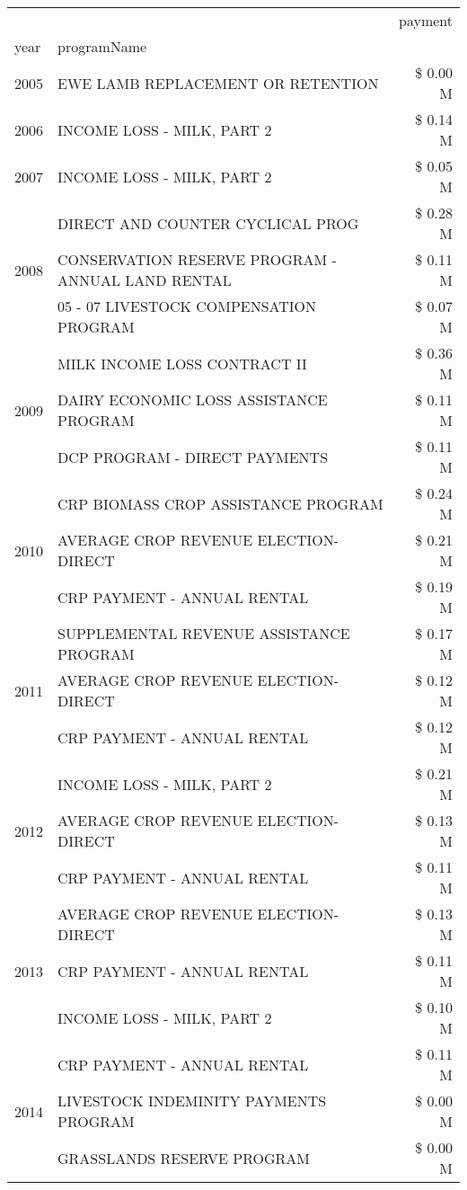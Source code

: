 \begin{tabular}{llr}
\toprule
 &  & payment \\
year & programName &  \\
\midrule
2005 & EWE LAMB REPLACEMENT OR RETENTION & \$ 0.00 M \\
\cline{1-3}
2006 & INCOME LOSS - MILK, PART 2 & \$ 0.14 M \\
\cline{1-3}
2007 & INCOME LOSS - MILK, PART 2 & \$ 0.05 M \\
\cline{1-3}
\multirow[t]{3}{*}{2008} & DIRECT AND COUNTER CYCLICAL PROG & \$ 0.28 M \\
 & CONSERVATION RESERVE PROGRAM - ANNUAL LAND RENTAL & \$ 0.11 M \\
 & 05 - 07 LIVESTOCK COMPENSATION PROGRAM & \$ 0.07 M \\
\cline{1-3}
\multirow[t]{3}{*}{2009} & MILK INCOME LOSS CONTRACT II & \$ 0.36 M \\
 & DAIRY ECONOMIC LOSS ASSISTANCE PROGRAM & \$ 0.11 M \\
 & DCP PROGRAM - DIRECT PAYMENTS & \$ 0.11 M \\
\cline{1-3}
\multirow[t]{3}{*}{2010} & CRP BIOMASS CROP ASSISTANCE PROGRAM & \$ 0.24 M \\
 & AVERAGE CROP REVENUE ELECTION-DIRECT & \$ 0.21 M \\
 & CRP PAYMENT - ANNUAL RENTAL & \$ 0.19 M \\
\cline{1-3}
\multirow[t]{3}{*}{2011} & SUPPLEMENTAL REVENUE ASSISTANCE PROGRAM & \$ 0.17 M \\
 & AVERAGE CROP REVENUE ELECTION-DIRECT & \$ 0.12 M \\
 & CRP PAYMENT - ANNUAL RENTAL & \$ 0.12 M \\
\cline{1-3}
\multirow[t]{3}{*}{2012} & INCOME LOSS - MILK, PART 2 & \$ 0.21 M \\
 & AVERAGE CROP REVENUE ELECTION-DIRECT & \$ 0.13 M \\
 & CRP PAYMENT - ANNUAL RENTAL & \$ 0.11 M \\
\cline{1-3}
\multirow[t]{3}{*}{2013} & AVERAGE CROP REVENUE ELECTION-DIRECT & \$ 0.13 M \\
 & CRP PAYMENT - ANNUAL RENTAL & \$ 0.11 M \\
 & INCOME LOSS - MILK, PART 2 & \$ 0.10 M \\
\cline{1-3}
\multirow[t]{3}{*}{2014} & CRP PAYMENT - ANNUAL RENTAL & \$ 0.11 M \\
 & LIVESTOCK INDEMINITY PAYMENTS PROGRAM & \$ 0.00 M \\
 & GRASSLANDS RESERVE PROGRAM & \$ 0.00 M \\

\end{tabular}

